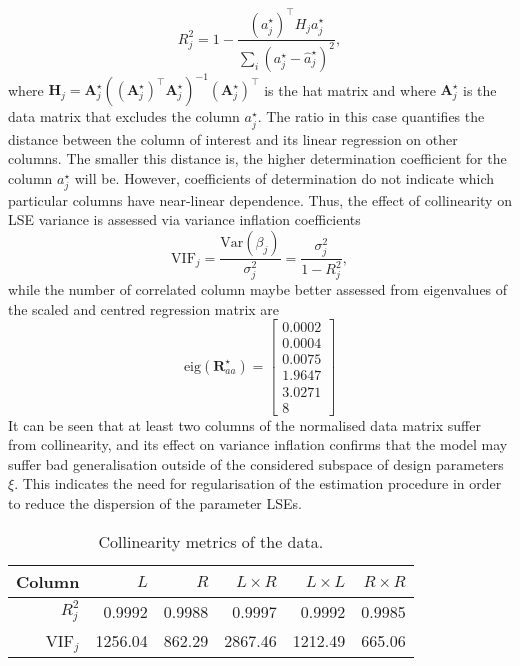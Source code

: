 \documentclass[a4paper,11pt,twoside]{article}
\theoremstyle{mytheoremstyle}
\begin{document}
\begin{equation*}
R^{2}_{j} = 1 - \frac{(a^{\star}_{j})^{\top} H_j a^{\star}_{j}}{\sum_{i}( a^{\star}_{j} - \hat{a}^{\star}_{j})^2},
\end{equation*} 
where $ \mathbf{H}_j = \mathbf{A}_{j}^{\star}((\mathbf{A}_{j}^{\star})^{\top}\mathbf{A}_{j}^{\star})^{-1}(\mathbf{A}_{j}^{\star})^{\top}$ is the hat matrix and where $\mathbf{A}_{j}^{\star}$ is the data matrix that excludes the column $a^{\star}_{j}$. The ratio in this case quantifies the distance between the column of interest and its linear  regression on other columns. The smaller this distance is, the higher determination coefficient for the column $a^{\star}_{j}$ will be. However, coefficients of determination do not indicate which particular columns have near-linear dependence. Thus, the effect of collinearity on LSE variance is assessed via variance inflation coefficients
\begin{equation*}
\text{VIF}_j = \frac{\text{Var}(\beta_j)}{\sigma^{2}_{j}} = \frac{\sigma^{2}_{j}}{1 - R^{2}_{j}},
\end{equation*}
while the number of correlated column maybe better assessed from eigenvalues of the scaled and centred regression matrix are
\begin{equation*}
\text{eig}(\mathbf{R}^{\star}_{aa}) = \left[\begin{array}{r}
0.0002\\
0.0004\\
0.0075\\
1.9647\\
3.0271\\
8
\end{array}\right]
\end{equation*}
It can be seen that at least two columns of the normalised data matrix suffer from collinearity, and its effect on variance inflation confirms that the model may suffer bad generalisation outside of the considered subspace of design parameters $\xi$. This indicates the need for regularisation of the estimation procedure in order to reduce the dispersion of the parameter LSEs.
\begin{table}[!h]
	\centering
	\caption{Collinearity metrics of the data.}\label{tab:vifs}
	\begin{tabular}{rrrrrr}
		Column & $L$ & $R$ & $L \times R$ & $L \times L$ & $R \times R$ \\
		\hline
		$R^{2}_{j}$ & 0.9992  &  0.9988  &  0.9997  &  0.9992  &  0.9985 \\
		VIF$_j$ & 1256.04 & 862.29 & 2867.46 & 1212.49 & 665.06 \\
		\hline
	\end{tabular}
\end{table}
\end{document}
